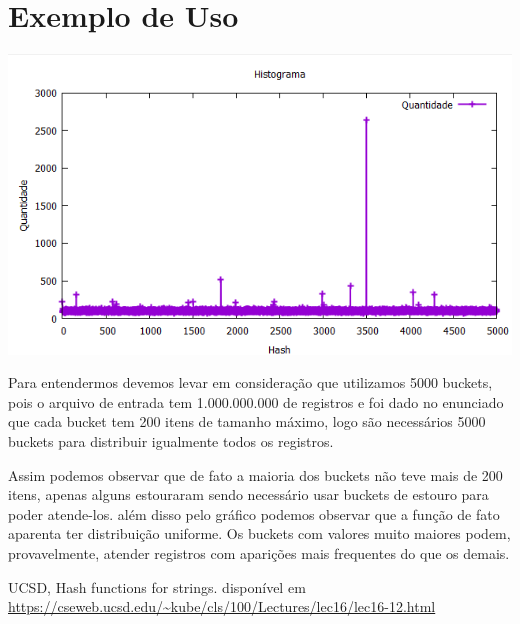 \documentclass[12pt,openright,oneside,a4paper,brazil]{abntex2}
\theoremstyle{plain}
\theoremstyle{definition}
\begin{document}
\chapter{Exemplo de Uso}
\begin{center}
\includegraphics{hash_horner.png}
\end{center}
Para entendermos devemos levar em consideração que utilizamos 5000 buckets, pois o arquivo de entrada tem 1.000.000.000 de registros e foi dado no enunciado que cada bucket tem 200 itens de tamanho máximo, logo são necessários 5000 buckets para distribuir igualmente todos os registros. 

Assim podemos observar que de fato a maioria dos buckets não teve mais de 200 itens, apenas alguns estouraram sendo necessário usar buckets de estouro para poder atende-los. além disso pelo gráfico podemos observar que a função de fato aparenta ter distribuição uniforme. Os buckets com valores muito maiores podem, provavelmente, atender registros com aparições mais frequentes do que os demais. 

\begin{thebibliography}{00}
	UCSD, Hash functions for strings.
	disponível em \url{https://cseweb.ucsd.edu/~kube/cls/100/Lectures/lec16/lec16-12.html}
\end{thebibliography}

    
\end{document}
